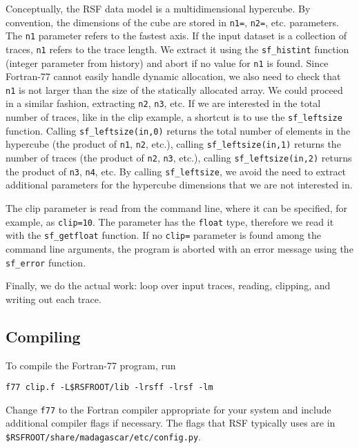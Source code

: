 
Conceptually, the RSF data model is a multidimensional hypercube. By
convention, the dimensions of the cube are stored in \texttt{n1=},
\texttt{n2=}, etc. parameters. The \texttt{n1} parameter refers to the
fastest axis. If the input dataset is a collection of traces,
\texttt{n1} refers to the trace length. We extract it using the
\texttt{sf\_histint} function (integer parameter from history) and
abort if no value for \texttt{n1} is found. Since Fortran-77 cannot
easily handle dynamic allocation, we also need to check that
\texttt{n1} is not larger than the size of the statically allocated
array. We could proceed in a similar fashion, extracting \texttt{n2},
\texttt{n3}, etc. If we are interested in the total number of traces,
like in the clip example, a shortcut is to use the
\texttt{sf\_leftsize} function.  Calling \texttt{sf\_leftsize(in,0)}
returns the total number of elements in the hypercube (the product of
\texttt{n1}, \texttt{n2}, etc.), calling \texttt{sf\_leftsize(in,1)}
returns the number of traces (the product of \texttt{n2}, \texttt{n3},
etc.), calling \texttt{sf\_leftsize(in,2)} returns the product of
\texttt{n3}, \texttt{n4}, etc. By calling \texttt{sf\_leftsize}, we
avoid the need to extract additional parameters for the hypercube
dimensions that we are not interested in.


The clip parameter is read from the command line, where it can be
specified, for example, as \texttt{clip=10}. The parameter has the
\texttt{float} type, therefore we read it with the
\texttt{sf\_getfloat} function. If no \texttt{clip=} parameter is
found among the command line arguments, the program is aborted with an
error message using the \texttt{sf\_error} function.


Finally, we do the actual work: loop over input traces, reading,
clipping, and writing out each trace.

\subsection{Compiling}

To compile the Fortran-77 program, run
\begin{verbatim}
f77 clip.f -L$RSFROOT/lib -lrsff -lrsf -lm
\end{verbatim}
Change \texttt{f77} to the Fortran compiler appropriate for your system and
include additional compiler flags if necessary. The flags that RSF typically
uses are in \\ \texttt{\$RSFROOT/share/madagascar/etc/config.py}.


